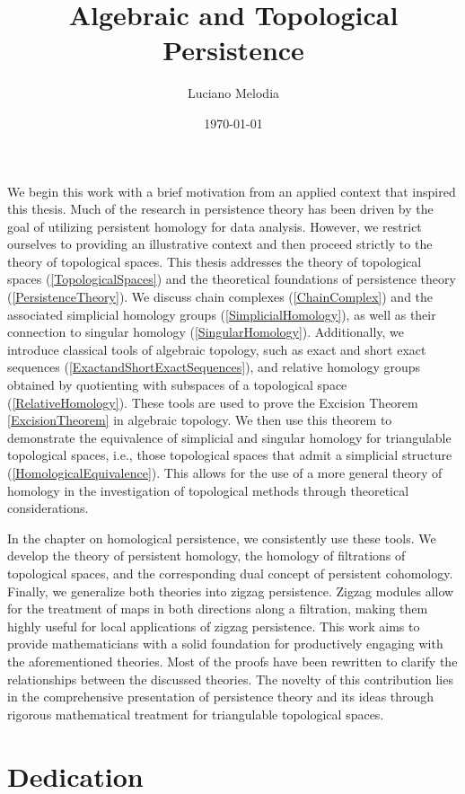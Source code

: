 \documentclass[b5paper, 12pt, twoside]{report}
\title{Algebraic and Topological Persistence}
\author{Luciano Melodia}
\date{\today}
\begin{document}
	
	
	We begin this work with a brief motivation from an applied context that inspired
	this thesis. Much of the research in persistence theory has been driven by the
	goal of utilizing persistent homology for data analysis. However, we restrict
	ourselves to providing an illustrative context and then proceed strictly to
	the theory of topological spaces. This thesis addresses the theory of topological
	spaces (\ref{TopologicalSpaces}) and the theoretical foundations of persistence
	theory (\ref{PersistenceTheory}). We discuss chain complexes (\ref{ChainComplex})
	and the associated simplicial homology groups (\ref{SimplicialHomology}), as well
	as their connection to singular homology (\ref{SingularHomology}).
	Additionally, we introduce classical tools of algebraic topology, such as
	exact and short exact sequences (\ref{ExactandShortExactSequences}), and relative
	homology groups obtained by quotienting with subspaces of a topological space (\ref{RelativeHomology}).
	These tools are used to prove the Excision Theorem \ref{ExcisionTheorem} in
	algebraic topology. We then use this theorem to demonstrate the equivalence of
	simplicial and singular homology for triangulable topological spaces, i.e.,
	those topological spaces that admit a simplicial structure (\ref{HomologicalEquivalence}).
	This allows for the use of a more general theory of homology in the investigation
	of topological methods through theoretical considerations.

	In the chapter on homological persistence, we consistently use these tools. We
	develop the theory of persistent homology, the homology of filtrations of
	topological spaces, and the corresponding dual concept of persistent cohomology.
	Finally, we generalize both theories into zigzag persistence. Zigzag modules
	allow for the treatment of maps in both directions along a filtration, making them
	highly useful for local applications of zigzag persistence. This work aims to
	provide mathematicians with a solid foundation for productively engaging with
	the aforementioned theories. Most of the proofs have been rewritten to clarify
	the relationships between the discussed theories. The novelty of this
	contribution lies in the comprehensive presentation of persistence theory and
	its ideas through rigorous mathematical treatment for triangulable topological
	spaces.
	\chapter*{Dedication}
\end{document}
